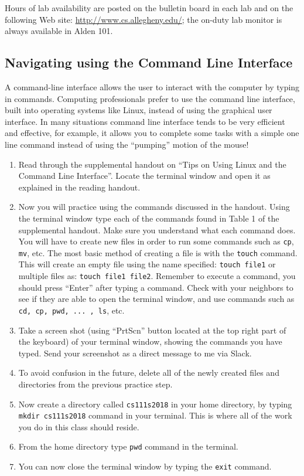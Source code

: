 \noindent Hours of lab availability are posted on the bulletin board in each lab and on the following Web site:
\url{http://www.cs.allegheny.edu/}; the on-duty lab monitor is always available in Alden 101.

\vspace*{-.2in}
\subsection*{Navigating using the Command Line Interface}
\vspace*{-.1in}
A command-line interface allows the user to interact with the computer by typing in commands. Computing professionals prefer to use the command line interface, built into operating systems like Linux, instead of using the graphical user interface. In many situations command line interface tends to be very efficient and effective, for example, it allows you to complete some tasks with a simple one line command instead of using the ``pumping'' motion of the mouse!
\vspace*{-.1in}
\begin{enumerate}
\item Read through the supplemental handout on ``Tips on Using Linux and the Command Line Interface''. Locate the terminal window and open it as explained in the reading handout. 
\item Now you will practice using the commands discussed in the handout. Using the terminal window type each of the commands found in Table 1 of the supplemental handout. Make sure you understand what each command does. You will have to create new files in order to run some commands such as {\tt cp}, {\tt mv}, etc. The most basic method of creating a file is with the {\tt touch} command. This will create an empty file using the name specified: {\tt touch file1} or multiple files as: {\tt touch file1 file2}. 
Remember to execute a command, you should press ``Enter'' after typing a command. Check with your neighbors to see if they are able to open the terminal window, and use commands such as {\tt cd, cp, pwd, ... , ls}, etc.
\item Take a screen shot (using ``PrtScn'' button located at the top right part of the keyboard) of your terminal window, showing the commands you have typed. Send your screenshot as a direct message to me via Slack.
\item To avoid confusion in the future, delete all of the newly created files and directories from the previous practice step. 
\item Now create a directory  called {\tt cs111s2018}  in your home directory, by typing {\tt mkdir cs111s2018} command in your terminal.  This is where all of the work you do in this class should reside. 
\item From the home directory type {\tt pwd} command in the terminal. 
\item You can now close the terminal window by typing the {\tt exit} command. 
\end{enumerate}


